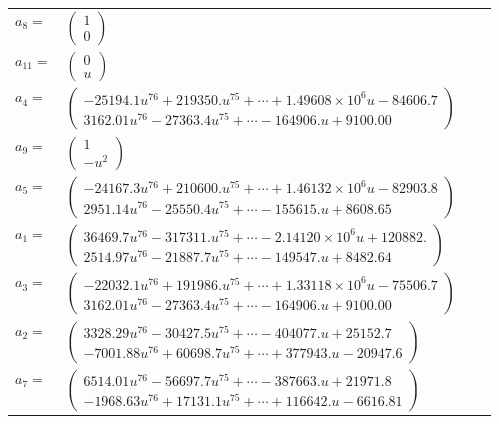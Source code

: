 \documentclass[1p]{elsarticle_modified}
\theoremstyle{definition}
\begin{document}
\begin{tabular}{m{7pt} m{180pt} m{7pt} m{180pt} }
\flushright $a_{8}=$&$\begin{pmatrix}1\\0\end{pmatrix}$ \\
\flushright $a_{11}=$&$\begin{pmatrix}0\\u\end{pmatrix}$ \\
\flushright $a_{4}=$&$\begin{pmatrix}-25194.1 u^{76}+219350. u^{75}+\cdots+1.49608\times10^{6} u-84606.7\\3162.01 u^{76}-27363.4 u^{75}+\cdots-164906. u+9100.00\end{pmatrix}$ \\
\flushright $a_{9}=$&$\begin{pmatrix}1\\- u^2\end{pmatrix}$ \\
\flushright $a_{5}=$&$\begin{pmatrix}-24167.3 u^{76}+210600. u^{75}+\cdots+1.46132\times10^{6} u-82903.8\\2951.14 u^{76}-25550.4 u^{75}+\cdots-155615. u+8608.65\end{pmatrix}$ \\
\flushright $a_{1}=$&$\begin{pmatrix}36469.7 u^{76}-317311. u^{75}+\cdots-2.14120\times10^{6} u+120882.\\2514.97 u^{76}-21887.7 u^{75}+\cdots-149547. u+8482.64\end{pmatrix}$ \\
\flushright $a_{3}=$&$\begin{pmatrix}-22032.1 u^{76}+191986. u^{75}+\cdots+1.33118\times10^{6} u-75506.7\\3162.01 u^{76}-27363.4 u^{75}+\cdots-164906. u+9100.00\end{pmatrix}$ \\
\flushright $a_{2}=$&$\begin{pmatrix}3328.29 u^{76}-30427.5 u^{75}+\cdots-404077. u+25152.7\\-7001.88 u^{76}+60698.7 u^{75}+\cdots+377943. u-20947.6\end{pmatrix}$ \\
\flushright $a_{7}=$&$\begin{pmatrix}6514.01 u^{76}-56697.7 u^{75}+\cdots-387663. u+21971.8\\-1968.63 u^{76}+17131.1 u^{75}+\cdots+116642. u-6616.81\end{pmatrix}$ \\

\end{tabular}
\end{document}
